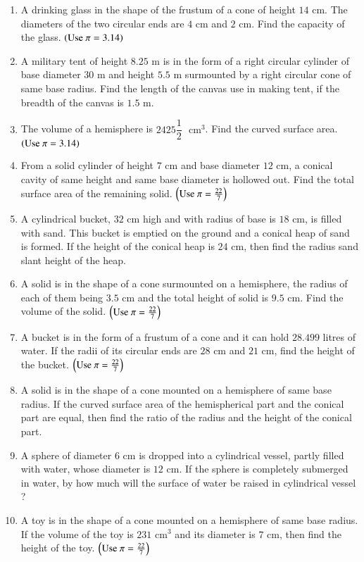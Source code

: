 \documentclass[journal,12pt,onecolumn]{IEEEtran}
\theoremstyle{remark}
\begin{document}
\begin{enumerate}
\item A drinking glass in the shape of the frustum of a cone of height $14 \text{ cm}$. The diameters of the two circular ends are $4 \text{ cm}$ and $2 \text{ cm}$. Find the capacity of the glass.  $\left(\text{Use } \pi = 3.14\right)$ 

\item  A military tent of height $8.25 \text{ m}$ is in the form of a right circular cylinder of base diameter $30 \text{ m}$ and height $5.5 \text{ m}$ surmounted by a right circular cone of same base radius. Find the length of the canvas use in making tent, if the breadth of the canvas is $1.5 \text{ m}$. 

\item The volume of a hemisphere is $2425\dfrac{1}{2}$ $\text{ cm}^3$. Find the curved surface area.  $\left(\text{Use } \pi = 3.14\right)$ 

\item From a solid cylinder of height $7\text{ cm}$ and base diameter $12\text{ cm}$, a conical cavity of same height and same base diameter is hollowed out. Find the total surface area of the remaining solid. $\left(\text{Use } \pi = \frac{22}{7}\right)$ 

\item A cylindrical bucket, $32 \text{ cm}$ high and with radius of base is $18 \text{ cm}$, is filled with sand. This bucket is emptied on the ground and a conical heap of sand is formed. If the height of the conical heap is $24 \text{ cm}$, then find the radius sand slant height of the heap. 


\item A solid is in the shape of a cone surmounted on a hemisphere, the radius of each of them being $3.5\text{ cm}$ and the total height of solid is $9.5\text{ cm}$. Find the volume of the solid. $\left(\text{Use } \pi = \frac{22}{7}\right)$ 

\item A bucket is in the form of a frustum of a cone and it can hold $28.499$ litres of water. If the radii of its circular ends are $28\text{ cm}$ and $21\text{ cm}$, find the height of the bucket. $\left(\text{Use } \pi = \frac{22}{7}\right)$ 


\item A solid is in the shape of a cone mounted on a hemisphere of same base radius. If the curved surface area of the hemispherical part and the conical part are equal, then find the ratio of the radius and the height of the conical part. 

\item A sphere of diameter $6\text{ cm}$ is dropped into a cylindrical vessel, partly filled with water, whose diameter is $12\text{ cm}$. If the sphere is completely submerged in water, by how much will the surface of water be raised in cylindrical vessel ? 
\item A toy is in the shape of a cone mounted on a hemisphere of same base radius. If the volume of the toy is $231\text{ cm}^3$ and its diameter is $7\text{ cm}$, then find the height of the toy.  $\left(\text{Use } \pi = \frac{22}{7}\right)$ 


\end{enumerate}
\end{document}
